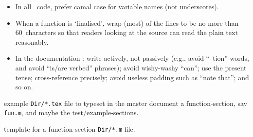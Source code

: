 \begin{itemize}
\item In all \script\ code, prefer camal case for variable names (not underscores).

\item When a function is `finalised', wrap (most) of the lines to be no more than 60~characters so that readers looking at the source can read the plain text reasonably.

\item In the documentation \cite[e.g.,][Ch.~4]{Higham98}: 
write actively, not passively (e.g., avoid ``--tion'' words, and avoid ``is/are verbed'' phrases);
avoid wishy-washy ``can'';
use the present tense;
cross-reference precisely;
avoid useless padding such as ``note that'';
and so on.

\end{itemize}


\begin{table}
\caption{\label{tbl:funtex}example \texttt{Dir/*.tex} file to typeset in the master document a function-section, say \texttt{fun.m}, and maybe the test\slash example-sections.}
\end{table}
\begin{table}
\caption{\label{tbl:format}template for a function-section \texttt{Dir/*.m} file.}
\end{table}


